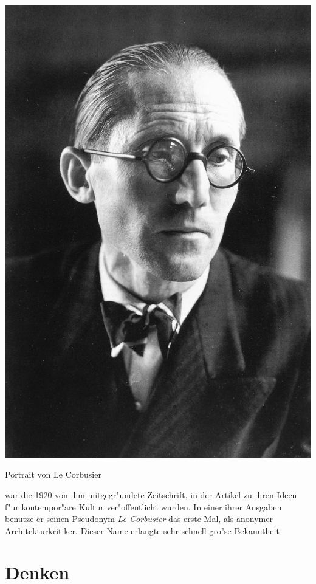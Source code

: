 \documentclass[a4paper]{tufte-handout}
\begin{document}
\begin{marginfigure}%
  \includegraphics[width=\linewidth]{portrait}
  \caption{Portrait von Le Corbusier}
  \label{fig:portrait}
\end{marginfigure}

 war die 1920 von ihm mitgegr"undete Zeitschrift, in der Artikel zu ihren Ideen f"ur kontempor"are Kultur ver"offentlicht wurden. In einer ihrer Ausgaben benutze er seinen Pseudonym \emph{Le Corbusier} das erste Mal, als anonymer Architekturkritiker. Dieser Name erlangte sehr schnell gro"se Bekanntheit


\section{Denken}\label{sec:page-layout}
\end{document}

